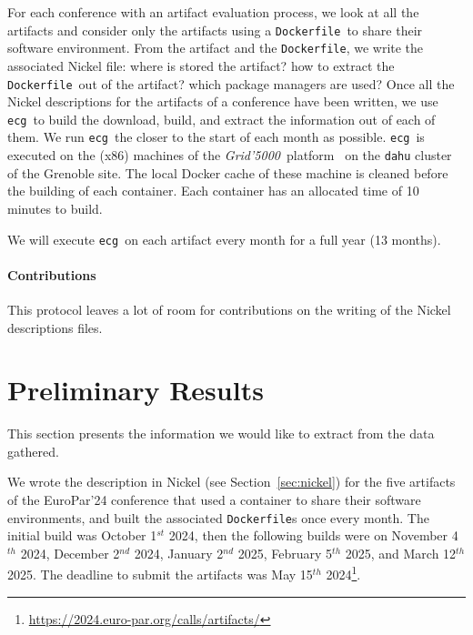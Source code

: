 \documentclass[sigconf,natbib=false]{acmart}
\newcommand{\grid}{\emph{Grid'5000}}
\newcommand{\df}{\texttt{Dockerfile}}
\newcommand{\ecg}{\texttt{ecg}}
\newcommand{\todo}[1]{{\color{red}{TODO: #1}}}
\begin{document}
For each conference with an artifact evaluation process, we look at all the artifacts and consider only the artifacts using a \df\ to share their software environment.
From the artifact and the \df, we write the associated Nickel file: where is stored the artifact? how to extract the \df\ out of the artifact? which package managers are used?
Once all the Nickel descriptions for the artifacts of a conference have been written, we use \ecg\ to build the download, build, and extract the information out of each of them.
We run \ecg\ the closer to the start of each month as possible.
\ecg\ is executed on the (x86) machines of the \grid\ platform~\cite{grid5000} on the \texttt{dahu} cluster of the Grenoble site.
The local Docker cache of these machine is cleaned before the building of each container.
Each container has an allocated time of 10 minutes to build.

We will execute \ecg\ on each artifact every month for a full year (13 months).

\paragraph{Contributions}

This protocol leaves a lot of room for contributions on the writing of the Nickel descriptions files.

% 

\section{Preliminary Results}\label{sec:results}

This section presents the information we would like to extract from the data gathered.


We wrote the description in Nickel (see Section~\ref{sec:nickel}) for the five artifacts of the EuroPar'24 conference that used a container to share their software environments, and built the associated \df s once every month.
The initial build was October 1$^{st}$ 2024, then the following builds were on November 4$^{th}$ 2024, December 2$^{nd}$ 2024, January 2$^{nd}$ 2025, February 5$^{th}$ 2025, and March 12$^{th}$ 2025.
The deadline to submit the artifacts was May 15$^{th}$ 2024\footnote{\url{https://2024.euro-par.org/calls/artifacts/}}.
\end{document}
